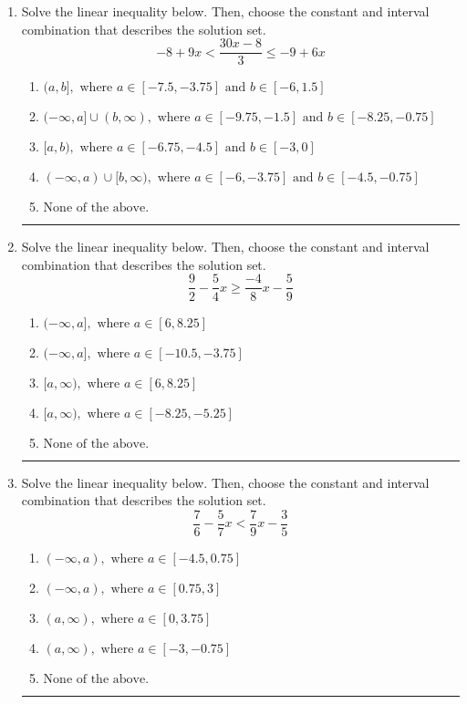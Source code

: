 \documentclass[14pt]{extbook}
\newcommand{\litem}[1]{\item#1\hspace*{-1cm}\rule{\textwidth}{0.4pt}}
\begin{document}
\begin{enumerate}
\litem{
Solve the linear inequality below. Then, choose the constant and interval combination that describes the solution set.\[ -8 + 9 x < \frac{30 x - 8}{3} \leq -9 + 6 x \]\begin{enumerate}[label=\Alph*.]
\item \( (a, b], \text{ where } a \in [-7.5, -3.75] \text{ and } b \in [-6, 1.5] \)
\item \( (-\infty, a] \cup (b, \infty), \text{ where } a \in [-9.75, -1.5] \text{ and } b \in [-8.25, -0.75] \)
\item \( [a, b), \text{ where } a \in [-6.75, -4.5] \text{ and } b \in [-3, 0] \)
\item \( (-\infty, a) \cup [b, \infty), \text{ where } a \in [-6, -3.75] \text{ and } b \in [-4.5, -0.75] \)
\item \( \text{None of the above.} \)

\end{enumerate} }
\litem{
Solve the linear inequality below. Then, choose the constant and interval combination that describes the solution set.\[ \frac{9}{2} - \frac{5}{4} x \geq \frac{-4}{8} x - \frac{5}{9} \]\begin{enumerate}[label=\Alph*.]
\item \( (-\infty, a], \text{ where } a \in [6, 8.25] \)
\item \( (-\infty, a], \text{ where } a \in [-10.5, -3.75] \)
\item \( [a, \infty), \text{ where } a \in [6, 8.25] \)
\item \( [a, \infty), \text{ where } a \in [-8.25, -5.25] \)
\item \( \text{None of the above}. \)

\end{enumerate} }
\litem{
Solve the linear inequality below. Then, choose the constant and interval combination that describes the solution set.\[ \frac{7}{6} - \frac{5}{7} x < \frac{7}{9} x - \frac{3}{5} \]\begin{enumerate}[label=\Alph*.]
\item \( (-\infty, a), \text{ where } a \in [-4.5, 0.75] \)
\item \( (-\infty, a), \text{ where } a \in [0.75, 3] \)
\item \( (a, \infty), \text{ where } a \in [0, 3.75] \)
\item \( (a, \infty), \text{ where } a \in [-3, -0.75] \)
\item \( \text{None of the above}. \)


\end{enumerate}}
\end{enumerate}
\end{document}
